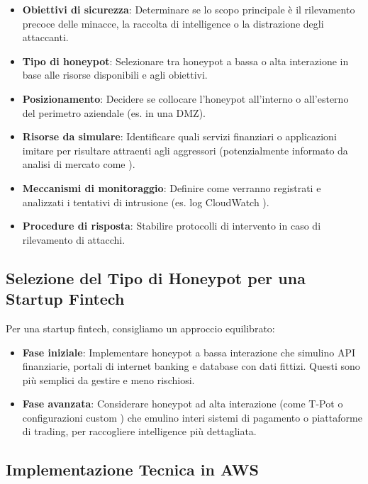 \begin{itemize}
    \item \textbf{Obiettivi di sicurezza}: Determinare se lo scopo principale è il rilevamento precoce delle minacce, la raccolta di intelligence o la distrazione degli attaccanti.
    \item \textbf{Tipo di honeypot}: Selezionare tra honeypot a bassa o alta interazione in base alle risorse disponibili e agli obiettivi.
    \item \textbf{Posizionamento}: Decidere se collocare l'honeypot all'interno o all'esterno del perimetro aziendale (es. in una DMZ).
    \item \textbf{Risorse da simulare}: Identificare quali servizi finanziari o applicazioni imitare per risultare attraenti agli aggressori (potenzialmente informato da analisi di mercato come \cite{fricano2017}).
    \item \textbf{Meccanismi di monitoraggio}: Definire come verranno registrati e analizzati i tentativi di intrusione (es. log CloudWatch \cite{cloudwatch_pricing}).
    \item \textbf{Procedure di risposta}: Stabilire protocolli di intervento in caso di rilevamento di attacchi.
\end{itemize}

\subsection{Selezione del Tipo di Honeypot per una Startup Fintech}
\label{subsec:selezione_tipo}

Per una startup fintech, consigliamo un approccio equilibrato:

\begin{itemize}
    \item \textbf{Fase iniziale}: Implementare honeypot a bassa interazione che simulino API finanziarie, portali di internet banking e database con dati fittizi. Questi sono più semplici da gestire e meno rischiosi.
    \item \textbf{Fase avanzata}: Considerare honeypot ad alta interazione (come T-Pot \cite{zhang_2023} o configurazioni custom \cite{tsang_2022}) che emulino interi sistemi di pagamento o piattaforme di trading, per raccogliere intelligence più dettagliata.
\end{itemize}

\subsection{Implementazione Tecnica in AWS}
\label{subsec:implementazione_tecnica}

